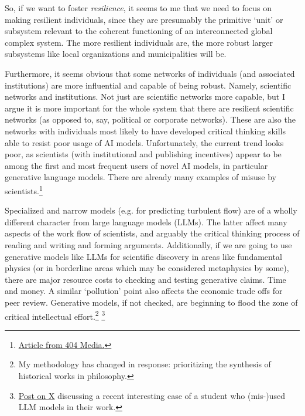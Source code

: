 \documentclass[11pt, oneside]{article}   	%
\begin{document}
So, if we want to foster \emph{resilience}, it seems to me that we need to focus on making resilient individuals, since they are presumably the primitive  `unit' or subsystem relevant to the coherent functioning of an interconnected global complex system.  The more resilient individuals are, the more robust  larger subsystems like local organizations and municipalities will be.

Furthermore, it seems obvious that some networks of individuals (and associated institutions) are more influential and capable of being robust.  Namely, scientific networks and institutions.  Not just are scientific networks more capable, but I argue it is more important for the whole system that there are resilient scientific networks (as opposed to, say, political or corporate networks).  These are also the networks with individuals most likely to have developed critical thinking skills able to resist poor usage of AI models.  Unfortunately, the current trend looks poor, as scientists (with institutional and publishing incentives) appear to be among the first and most frequent users of novel AI models, in particular generative language models.  There are already many examples of misuse by scientists.\footnote{\href{https://www.404media.co/scientific-journals-are-publishing-papers-with-ai-generated-text/}{Article from 404 Media.}}

Specialized and narrow models (e.g. for predicting turbulent flow) are of a wholly different character from large language models (LLMs).  The latter affect many aspects of the work flow of scientists, and arguably the critical thinking process of reading and writing and forming arguments.  Additionally, if we are going to use generative models like LLMs for scientific discovery in areas like fundamental physics (or in borderline areas which may be considered metaphysics by some), there are major resource costs to checking and testing generative claims.  Time and money.  A similar `pollution' point also affects the economic trade offs for peer review.  Generative models, if not checked, are beginning to flood the zone of critical intellectual effort.\footnote{My methodology has changed in response: prioritizing the synthesis of historical works in philosophy.} \footnote{\href{https://twitter.com/BeebsMemes/status/1759282741680443600}{Post on X} discussing a recent interesting case of a student who (mis-)used LLM models in their work.}

\end{document}
